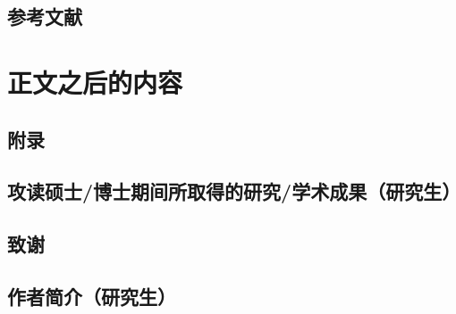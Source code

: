         \subsection{参考文献}
    \section{正文之后的内容}
        \subsection{附录}
        \subsection{攻读硕士\slash 博士期间所取得的研究\slash 学术成果（研究生）}
        \subsection{致谢}
        \subsection{作者简介（研究生）}
